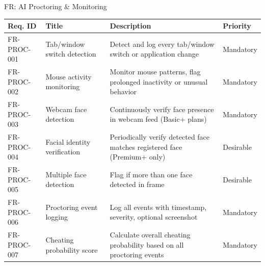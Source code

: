 \begin{frame}{FR: AI Proctoring \& Monitoring}
    \begin{table}[]
        \centering
        \tiny
        \begin{tabular}{|l|p{3.5cm}|p{5cm}|l|}
            \hline
            \textbf{Req. ID} & \textbf{Title} & \textbf{Description} & \textbf{Priority} \\
            \hline
            FR-PROC-001 & Tab/window switch detection & Detect and log every tab/window switch or application change & Mandatory \\
            \hline
            FR-PROC-002 & Mouse activity monitoring & Monitor mouse patterns, flag prolonged inactivity or unusual behavior & Mandatory \\
            \hline
            FR-PROC-003 & Webcam face detection & Continuously verify face presence in webcam feed (Basic+ plans) & Mandatory \\
            \hline
            FR-PROC-004 & Facial identity verification & Periodically verify detected face matches registered face (Premium+ only) & Desirable \\
            \hline
            FR-PROC-005 & Multiple face detection & Flag if more than one face detected in frame & Desirable \\
            \hline
            FR-PROC-006 & Proctoring event logging & Log all events with timestamp, severity, optional screenshot & Mandatory \\
            \hline
            FR-PROC-007 & Cheating probability score & Calculate overall cheating probability based on all proctoring events & Mandatory \\
            \hline
        \end{tabular}
    \end{table}
\end{frame}

